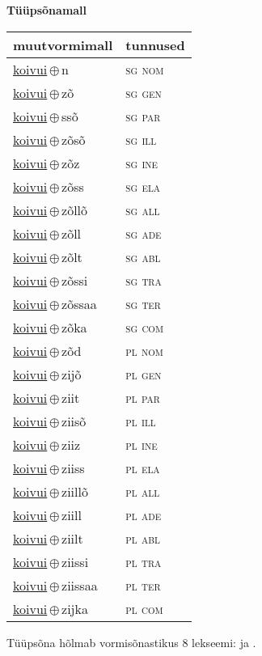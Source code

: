 

\vspace{3.5em}
\noindent \begin{minipage}{\textwidth}
\noindent \textbf{Tüüpsõnamall \,}\\

\begin{sideways}
\begin{tabular}{l l}
muutvormimall & tunnused \\
\hline
\underline{koivui}\,$\oplus$\,n & \textsc{ sg nom } \\
\underline{koivui}\,$\oplus$\,zõ & \textsc{ sg gen } \\
\underline{koivui}\,$\oplus$\,ssõ & \textsc{ sg par } \\
\underline{koivui}\,$\oplus$\,zõsõ & \textsc{ sg ill } \\
\underline{koivui}\,$\oplus$\,zõz & \textsc{ sg ine } \\
\underline{koivui}\,$\oplus$\,zõss & \textsc{ sg ela } \\
\underline{koivui}\,$\oplus$\,zõllõ & \textsc{ sg all } \\
\underline{koivui}\,$\oplus$\,zõll & \textsc{ sg ade } \\
\underline{koivui}\,$\oplus$\,zõlt & \textsc{ sg abl } \\
\underline{koivui}\,$\oplus$\,zõssi & \textsc{ sg tra } \\
\underline{koivui}\,$\oplus$\,zõssaa & \textsc{ sg ter } \\
\underline{koivui}\,$\oplus$\,zõka & \textsc{ sg com } \\
\underline{koivui}\,$\oplus$\,zõd & \textsc{ pl nom } \\
\underline{koivui}\,$\oplus$\,zijõ & \textsc{ pl gen } \\
\underline{koivui}\,$\oplus$\,ziit & \textsc{ pl par } \\
\underline{koivui}\,$\oplus$\,ziisõ & \textsc{ pl ill } \\
\underline{koivui}\,$\oplus$\,ziiz & \textsc{ pl ine } \\
\underline{koivui}\,$\oplus$\,ziiss & \textsc{ pl ela } \\
\underline{koivui}\,$\oplus$\,ziillõ & \textsc{ pl all } \\
\underline{koivui}\,$\oplus$\,ziill & \textsc{ pl ade } \\
\underline{koivui}\,$\oplus$\,ziilt & \textsc{ pl abl } \\
\underline{koivui}\,$\oplus$\,ziissi & \textsc{ pl tra } \\
\underline{koivui}\,$\oplus$\,ziissaa & \textsc{ pl ter } \\
\underline{koivui}\,$\oplus$\,zijka & \textsc{ pl com } \\
\end{tabular}
\end{sideways}
\label{tab:tüüpsõnamall-koivuin}

\end{minipage}

 
\vspace{1em}
\noindent Tüüpsõna hõlmab vormisõnastikus 8 lekseemi:  ja .
